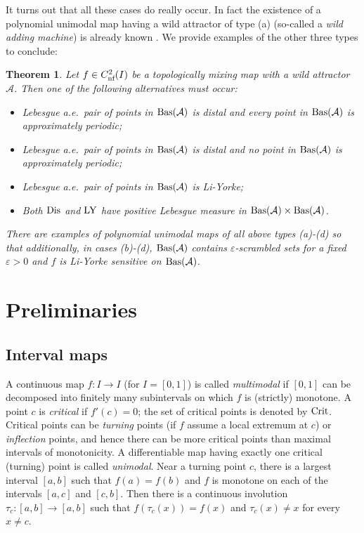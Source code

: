 \documentclass[12pt, psamsfonts, reqno]{amsart}
\newcounter{letter}
\newtheorem{maintheorem}[letter]{Theorem}
\begin{document}
It turns out that all these cases do really occur. In fact the
existence of a polynomial unimodal map having a wild attractor of
type (a) (so-called a \emph{wild adding machine}) is already known
\cite{Btree}. We provide examples of the other three types to
conclude:
\fi
\begin{maintheorem}\label{mainthm:Classification}
Let $f\in {C^2_{\text{\rm nf}}}(I)$ be a topologically mixing map with a wild
attractor ${{\mathcal A}}$. Then one of the following alternatives must occur:
\begin{itemize}
\item[(a)] Lebesgue a.e.\ pair of points in ${\mathop{\rm Bas}\nolimits}({{\mathcal A}})$ is distal and
every point in ${\mathop{\rm Bas}\nolimits}({{\mathcal A}})$ is approximately periodic;
\item[(b)] Lebesgue a.e.\ pair of points in ${\mathop{\rm Bas}\nolimits}({{\mathcal A}})$ is distal and
no point in ${\mathop{\rm Bas}\nolimits}({{\mathcal A}})$ is approximately periodic;
\item[(c)] Lebesgue a.e.\ pair of points in ${\mathop{\rm Bas}\nolimits}({{\mathcal A}})$ is Li-Yorke;
\item[(d)] Both ${\mathop{\rm Dis}\nolimits}$ and ${\mathop{\rm LY}\nolimits}$ have positive  Lebesgue measure in
${\mathop{\rm Bas}\nolimits}({{\mathcal A}})\times {\mathop{\rm Bas}\nolimits}({{\mathcal A}})$.
\end{itemize}
There are examples of polynomial unimodal maps of all
above types (a)-(d) so that additionally, in cases (b)-(d),
 ${\mathop{\rm Bas}\nolimits}({{\mathcal A}})$ contains ${\varepsilon}$-scrambled sets
for a fixed ${\varepsilon} > 0$ and $f$ is Li-Yorke sensitive on ${\mathop{\rm Bas}\nolimits}({{\mathcal A}})$.
\end{maintheorem}

\section{Preliminaries}\label{sec:prelimnaries}

\subsection{Interval maps}\label{subsec:maps}

A continuous map $f:I \to I$ (for $I=[0,1]$) is called
\emph{multimodal} if $[0,1]$ can be decomposed into finitely many
subintervals on which $f$ is (strictly) monotone. A point $c$
is \emph{critical} if $f'(c) = 0$; the set of critical points is
denoted by ${\mathop{\rm Crit}\nolimits}$. Critical points can be \emph{turning} points
(if $f$ assume a local extremum at $c$) or \emph{inflection}
points, and hence there can be more critical points than maximal
intervals of monotonicity. A differentiable map having exactly one
critical (turning) point is called \emph{unimodal}.
Near a turning
point $c$, there is a largest interval  $[a,b]$ such that
$f(a)=f(b)$ and $f$ is monotone on each of the intervals $[a,c]$
and $[c,b]$. Then there is a continuous involution
$\tau_c:[a,b]\to [a,b]$ such that $f(\tau_c(x))= f(x)$ and
$\tau_c(x)\neq x$ for every $x \neq c$.
\end{document}
